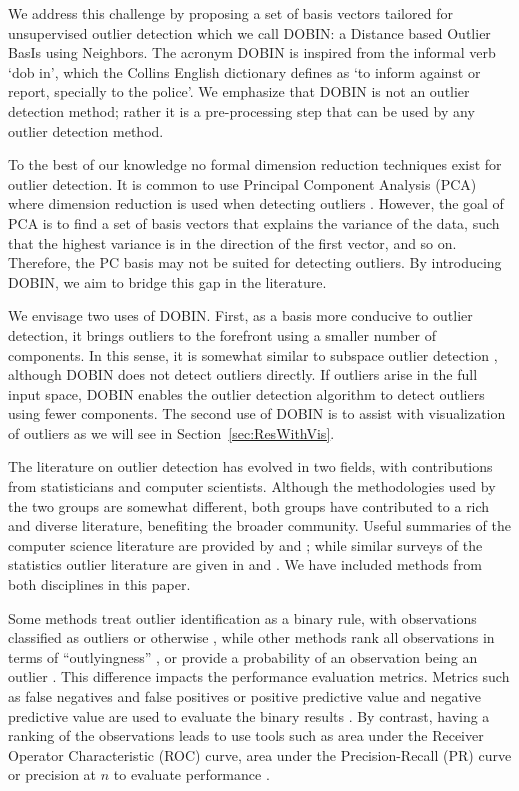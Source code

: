 \documentclass[letter,12pt]{article}
\begin{document}
We address this challenge by proposing a set of basis vectors tailored for unsupervised outlier detection which we call DOBIN: a Distance based Outlier BasIs using Neighbors. The acronym DOBIN is inspired from the informal verb `dob in', which the Collins English dictionary defines as `to inform against or report, specially to the police'. We emphasize that DOBIN is not an outlier detection method; rather it is a pre-processing step that can be used by any outlier detection method.

To the best of our knowledge no formal dimension reduction techniques exist for outlier detection. It is common to use Principal Component Analysis (PCA) where dimension reduction is used when detecting outliers \citep[e.g.,][]{talagala2019anomaly, hyndman2015large}. However, the goal of PCA is to find a set of basis vectors that explains the variance of the data, such that the highest variance is in the direction of the first vector, and so on. Therefore, the PC basis may not be suited for detecting outliers. By introducing DOBIN, we aim to bridge this gap in the literature.

We envisage two uses of DOBIN. First, as a basis more conducive to outlier detection, it brings outliers to the forefront using a smaller number of components. In this sense, it is somewhat similar to subspace outlier detection \citep[e.g.,][]{aggarwal2001outlier, keller2012hics}, although DOBIN does not detect outliers directly. If outliers arise in the full input space, DOBIN enables the outlier detection algorithm to detect outliers using fewer components. The second use of DOBIN is to assist with visualization of outliers as we will see in Section~\ref{sec:ResWithVis}.

The literature on outlier detection has evolved in two fields, with contributions from statisticians and computer scientists. Although the methodologies used by the two groups are somewhat different, both groups have contributed to a rich and diverse literature, benefiting the broader community. Useful summaries of the computer science literature are provided by \citet{goldstein2016comparative} and \citet{zimek2012survey}; while similar surveys of the statistics outlier literature are given in \citet{rousseeuw2005} and \citet{unwin2019multivariate}. We have included methods from both disciplines in this paper.

Some methods treat outlier identification as a binary rule, with observations classified as outliers or otherwise \citep[e.g.,][]{billor2000bacon, wilkinson2017visualizing, rousseeuw2018detecting}, while other methods rank all observations in terms of ``outlyingness'' \citep[e.g.,][]{breunig2000lof, liu2008isolation}, or provide a probability of an observation being an outlier \citep[e.g.,][]{kriegel2009loop}. This difference impacts the performance evaluation metrics. Metrics such as false negatives and false positives or positive predictive value and negative predictive value are used to evaluate the binary results \citep{wilkinson2017visualizing}. By contrast, having a ranking of the observations leads to use tools such as area under the Receiver Operator Characteristic (ROC) curve, area under the Precision-Recall (PR) curve or precision at $n$ to evaluate performance \citep{campos2016evaluation}.
\end{document}
